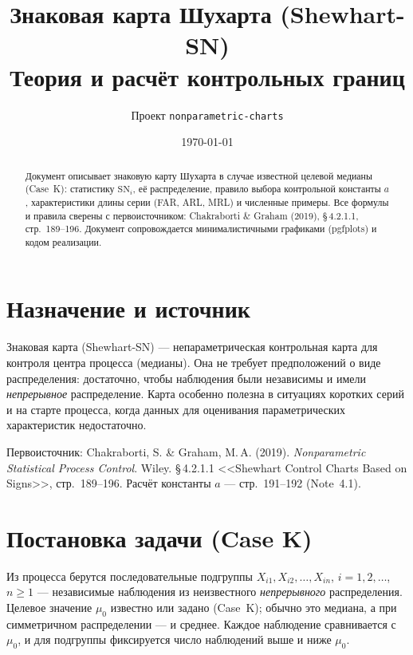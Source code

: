 \documentclass[11pt,a4paper]{article}
\title{\textbf{Знаковая карта Шухарта (Shewhart-SN)}\\[2pt]
\large Теория и расчёт контрольных границ}
\author{Проект \texttt{nonparametric-charts}}
\date{\today}
\newcommand{\SN}{\mathrm{SN}}
\begin{document}
\maketitle

\begin{abstract}
\noindent
Документ описывает знаковую карту Шухарта в случае известной целевой
медианы (Case~K): статистику $\SN_i$, её распределение, правило выбора
контрольной константы $a$, характеристики длины серии (FAR, ARL, MRL) и
численные примеры. Все формулы и правила сверены с первоисточником:
Chakraborti \& Graham (2019), \S\,4.2.1.1, стр.~189--196. Документ
сопровождается минималистичными графиками (pgfplots) и кодом реализации.
\end{abstract}

\tableofcontents
\bigskip

\section{Назначение и источник}

Знаковая карта (Shewhart-SN) --- непараметрическая контрольная карта для
контроля центра процесса (медианы). Она не требует предположений о виде
распределения: достаточно, чтобы наблюдения были независимы и имели
\emph{непрерывное} распределение. Карта особенно полезна в ситуациях
коротких серий и на старте процесса, когда данных для оценивания
параметрических характеристик недостаточно.

Первоисточник: Chakraborti, S. \& Graham, M.\,A. (2019).
\textit{Nonparametric Statistical Process Control}. Wiley.
\S\,4.2.1.1 <<Shewhart Control Charts Based on Signs>>, стр.~189--196.
Расчёт константы $a$ --- стр.~191--192 (Note~4.1).

\section{Постановка задачи (Case K)}

Из процесса берутся последовательные подгруппы
$X_{i1},X_{i2},\dots,X_{in}$, $i=1,2,\dots$, $n\ge 1$ --- независимые
наблюдения из неизвестного \emph{непрерывного} распределения. Целевое
значение $\mu_0$ известно или задано (Case~K); обычно это медиана, а при
симметричном распределении --- и среднее. Каждое наблюдение сравнивается
с $\mu_0$, и для подгруппы фиксируется число наблюдений выше и ниже
$\mu_0$.
\end{document}
